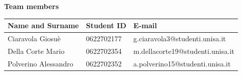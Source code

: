 \begin{titlepage}
    \begin{center}
        \textbf{Team members}\\
        \vspace{2mm}
        \begin{tabular}{|p{4.5cm}|p{2.5cm}|p{6cm}|}
            \hline
            \bf Name and Surname& \bf Student ID& \bf E-mail\\
            \hline
            Ciaravola Giosuè& 0622702177& g.ciaravola3@studenti.unisa.it\\ \hline 
            Della Corte Mario& 0622702354& m.dellacorte19@studenti.unisa.it\\ \hline
            Polverino Alessandro& 0622702352& a.polverino15@studenti.unisa.it\\ \hline 
        \end{tabular}
    \end{center}
    
    \vspace{12mm}
    

\end{titlepage}